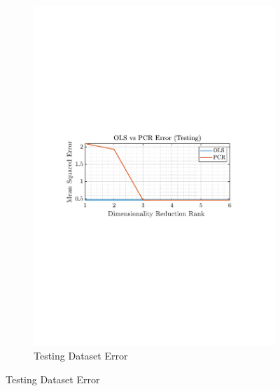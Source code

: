 \documentclass[12pt]{article}
\begin{document}
\begin{figure}[H]
\begin{subfigure}{0.49\textwidth}
 			\includegraphics[trim={2.2cm 11.2cm 3.15cm  11.2cm}, clip, width=\textwidth]{../MATLAB/figures/q1_6c_fig02.pdf} 
 			\captionsetup{justification=centering}
 			\caption{Testing Dataset Error}
 		\end{subfigure}
 		\label{fig: 1-6c}
 	\end{figure}
\end{document}
